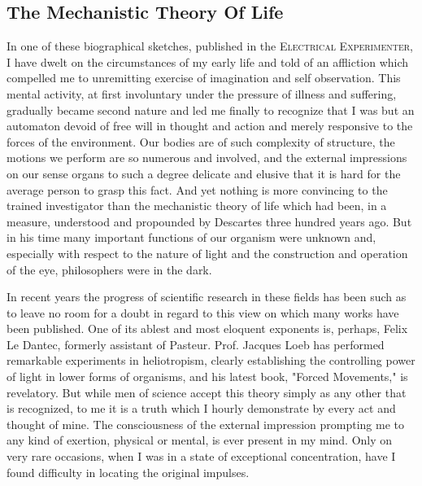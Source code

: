 \documentclass[a4paper,12pt,english,twoside,openright]{memoir}
\begin{document}
\subsection{The Mechanistic Theory Of Life}
In one of these biographical sketches, published in the \textsc{Electrical Experimenter}, I have 
dwelt on the circumstances of my early life and told of an affliction which compelled me to 
unremitting exercise of imagination and self observation.  This mental activity, at first involuntary 
under the pressure of illness and suffering, gradually became second nature and led me finally to 
recognize that I was but an automaton devoid of free will in thought and action and merely 
responsive to the forces of the environment.  Our bodies are of such complexity of structure, the 
motions we perform are so numerous and involved, and the external impressions on our sense 
organs to such a degree delicate and elusive that it is hard for the average person to grasp this 
fact.  And yet nothing is more convincing to the trained investigator than the mechanistic theory of 
life which had been, in a measure, understood and propounded by Descartes three hundred 
years ago.  But in his time many important functions of our organism were unknown and, 
especially with respect to the nature of light and the construction and operation of the eye, 
philosophers were in the dark.  

In recent years the progress of scientific research in these fields has been such as to leave no 
room for a doubt in regard to this view on which many works have been published.  One of its 
ablest and most eloquent exponents is, perhaps, Felix Le Dantec, formerly assistant of Pasteur.  
Prof. Jacques Loeb has performed remarkable experiments in heliotropism, clearly establishing 
the controlling power of light in lower forms of organisms, and his latest book, "Forced 
Movements," is revelatory.  But while men of science accept this theory simply as any other that 
is recognized, to me it is a truth which I hourly demonstrate by every act and thought of mine.  
The consciousness of the external impression prompting me to any kind of exertion, physical or 
mental, is ever present in my mind.  Only on very rare occasions, when I was in a state of 
exceptional concentration, have I found difficulty in locating the original impulses.  
\end{document}
